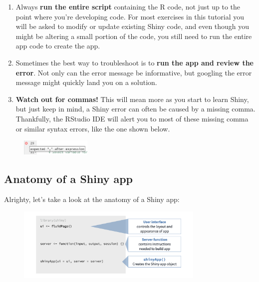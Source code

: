 \documentclass[
  letterpaper,
  DIV=11,
  numbers=noendperiod]{scrreprt}
\begin{document}
\begin{enumerate}
\def\labelenumi{\arabic{enumi}.}
\item
  Always \textbf{run the entire script} containing the R code, not just
  up to the point where you're developing code. For most exercises in
  this tutorial you will be asked to modify or update existing Shiny
  code, and even though you might be altering a small portion of the
  code, you still need to run the entire app code to create the app.
\item
  Sometimes the best way to troubleshoot is to \textbf{run the app and
  review the error}. Not only can the error message be informative, but
  googling the error message might quickly land you on a solution.
\item
  \textbf{Watch out for commas!} This will mean more as you start to
  learn Shiny, but just keep in mind, a Shiny error can often be caused
  by a missing comma. Thankfully, the RStudio IDE will alert you to most
  of these missing comma or similar syntax errors, like the one shown
  below.
\end{enumerate}

\begin{figure}

{\centering \includegraphics[width=0.3\textwidth,height=\textheight]{./images/missing-comma-ide.png}

}

\end{figure}

\hypertarget{anatomy-of-a-shiny-app}{%
\subsection{Anatomy of a Shiny app}\label{anatomy-of-a-shiny-app}}

Alrighty, let's take a look at the anatomy of a Shiny app:

\begin{figure}

{\centering \includegraphics[width=0.8\textwidth,height=\textheight]{./images/anatomy.png}

}

\end{figure}
\end{document}
